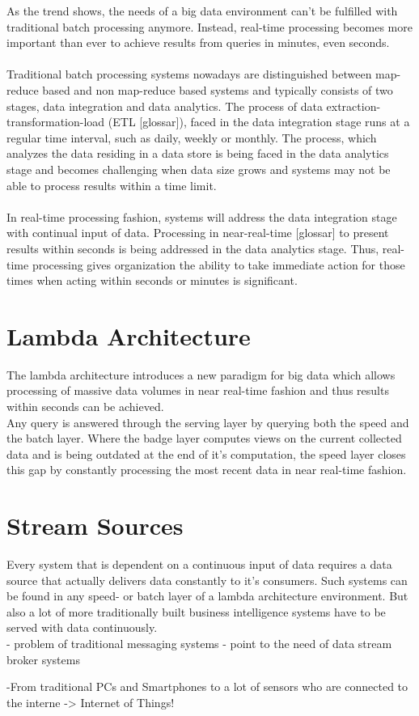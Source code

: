 As the trend shows, the needs of a big data environment can't be fulfilled with 
traditional batch processing anymore. Instead, real-time processing becomes more 
important than ever to achieve results from queries in minutes, even seconds. 
\cite{bange2013big}
\\ \\
Traditional batch processing systems nowadays are distinguished between
map-reduce based and non map-reduce based systems and typically consists of two
stages, data integration and data analytics. The process of data
extraction-transformation-load (ETL  [glossar]), faced in the data integration stage runs
at a regular time interval, such as daily, weekly or monthly. The process, which
analyzes the data residing in a data store is being faced in the data analytics
stage and becomes challenging when data size grows and systems may not be able
to process results within a time limit.\cite{Liu:2014:SRP:2628194.2628251}
\\ \\
In real-time processing fashion, systems will address the data integration stage
with continual input of data. Processing in near-real-time [glossar] to present 
results within seconds is being addressed in the data analytics stage. Thus,
real-time processing gives organization the ability to take immediate action
for those times when acting within seconds or minutes is significant.
\cite{PrpSvyOfDSPS}

\section{Lambda Architecture}
The lambda architecture introduces a new paradigm for big data which allows
processing of massive data volumes in near real-time fashion and thus results within
seconds can be achieved. 
\\
Any query is answered through the serving layer by querying 
both the speed and the batch layer. Where the badge layer computes views on the current collected data and
is being outdated at the end of it's computation, the speed layer closes this 
gap by constantly processing the most recent data in near real-time fashion. 
\cite{marz2015big} \cite{PrpSvyOfDSPS}

\section{Stream Sources}

Every system that is dependent on a continuous input of data requires a data
source that actually delivers data constantly to it's consumers. Such systems
can be found in any speed- or batch layer of a lambda architecture environment. 
But also a lot of more traditionally built business intelligence systems have to be
served with data continuously.
\\
- problem of traditional messaging systems
- point to the need of data stream broker systems


-From traditional PCs and Smartphones to a lot of sensors who are connected to
the interne -> Internet of Things!



